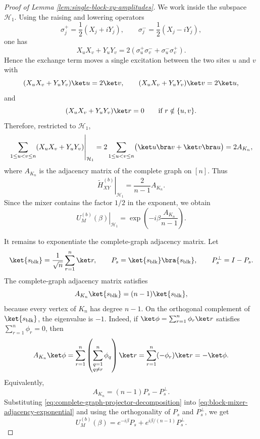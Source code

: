 \documentclass[a4paper,onecolumn,11pt,unpublished]{quantumarticle}
\theoremstyle{remark}
\begin{document}
\begin{proof}[Proof of Lemma \ref{lem:single-block-xy-amplitudes}]
We work inside the subspace \(\mathcal H_1\).
Using the raising and lowering operators
\[
\sigma_j^+ = \frac{1}{2}(X_j+iY_j),
\qquad
\sigma_j^- = \frac{1}{2}(X_j-iY_j),
\]
one has
\[
X_uX_v+Y_uY_v
=
2(\sigma_u^+\sigma_v^-+\sigma_u^-\sigma_v^+).
\]
Hence the exchange term moves a single excitation between the two sites
\(u\) and \(v\) with 
\[
(X_uX_v+Y_uY_v)\ket u=2\ket v,
\qquad
(X_uX_v+Y_uY_v)\ket v=2\ket u,
\]
and
\[
(X_uX_v+Y_uY_v)\ket r=0
\qquad
\text{if } r\notin\{u,v\}.
\]
Therefore, restricted to \(\mathcal H_1\),
\begin{equation}
\label{eq:xy-restricts-to-complete-graph}
\left.
\sum_{1\le u<v\le n}
(X_uX_v+Y_uY_v)
\right|_{\mathcal H_1}
=
2\sum_{1\le u<v\le n}
\bigl(\ket u\bra v+\ket v\bra u\bigr)
=
2A_{K_n},
\end{equation}
where \(A_{K_n}\) is the adjacency matrix of the complete graph on
\([n]\). Thus
\[
\left.
\widetilde H_{XY}^{(b)}
\right|_{\mathcal H_1}
=
\frac{2}{n-1}A_{K_n}.
\]
Since the mixer contains the factor \(1/2\) in the exponent, we obtain
\begin{equation}
\label{eq:block-mixer-adjacency-exponential}
\left.
U_M^{(b)}(\beta)
\right|_{\mathcal H_1}
=
\exp\!\left(
-i\beta\frac{A_{K_n}}{n-1}
\right).
\end{equation}

It remains to exponentiate the complete-graph adjacency matrix. Let
\[
\ket{s_{\mathrm{blk}}}
=
\frac{1}{\sqrt n}\sum_{r=1}^{n}\ket r,
\qquad
P_s=\ket{s_{\mathrm{blk}}}\bra{s_{\mathrm{blk}}},
\qquad
P_s^\perp=I-P_s.
\]
The complete-graph adjacency matrix satisfies
\[
A_{K_n}\ket{s_{\mathrm{blk}}}
=
(n-1)\ket{s_{\mathrm{blk}}},
\]
because every vertex of \(K_n\) has degree \(n-1\). On the orthogonal
complement of \(\ket{s_{\mathrm{blk}}}\), the eigenvalue is \(-1\). Indeed,
if \(\ket\phi=\sum_{r=1}^n \phi_r\ket r\) satisfies
\(\sum_{r=1}^n \phi_r=0\), then
\[
A_{K_n}\ket\phi
=
\sum_{r=1}^n
\left(
\sum_{\substack{q=1\\q\neq r}}^n \phi_q
\right)
\ket r
=
\sum_{r=1}^n
(-\phi_r)\ket r
=
-\ket\phi.
\]
Equivalently,
\begin{equation}
\label{eq:complete-graph-projector-decomposition}
A_{K_n}
=
(n-1)P_s-P_s^\perp.
\end{equation}
Substituting \eqref{eq:complete-graph-projector-decomposition} into
\eqref{eq:block-mixer-adjacency-exponential} and using the orthogonality of
\(P_s\) and \(P_s^\perp\), we get
\begin{equation}
\label{eq:block-mixer-projector-form}
U_M^{(b)}(\beta)
=
e^{-i\beta}P_s
+
e^{i\beta/(n-1)}P_s^\perp .
\end{equation}


\end{proof}
\end{document}
